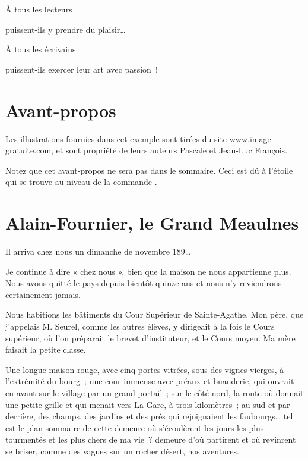 \documentclass[petitlivre]{livrelitt}
\begin{document}
\begin{dedicace}
À tous les lecteurs

puissent-ils y prendre du plaisir…

À tous les écrivains

puissent-ils exercer leur art avec passion !
\end{dedicace}

\chapter*{Avant-propos}

Les illustrations fournies dans cet exemple sont tirées du site www.image-gratuite.com, et sont propriété de leurs auteurs Pascale et Jean-Luc François.

Notez que cet avant-propos ne sera pas dans le sommaire. Ceci est dû à l'étoile qui se trouve au niveau de la commande .

\chapter{Alain-Fournier, le Grand Meaulnes}

Il arriva chez nous un dimanche de novembre 189…

Je continue à dire « chez nous », bien que la maison ne nous appartienne plus. Nous avons quitté le pays depuis bientôt quinze ans et nous n'y reviendrons certainement jamais.

Nous habitions les bâtiments du Cour Supérieur de Sainte-Agathe. Mon père, que j'appelais M. Seurel, comme les autres élèves, y dirigeait à la fois le Cours supérieur, où l'on préparait le brevet d'instituteur, et le Cours moyen. Ma mère faisait la petite classe.

Une longue maison rouge, avec cinq portes vitrées, sous des vignes vierges, à l'extrémité du bourg ; une cour immense avec préaux et buanderie, qui ouvrait en avant sur le village par un grand portail ; sur le côté nord, la route où donnait une petite grille et qui menait vers La Gare, à trois kilomètres ; au sud et par derrière, des champs, des jardins et des prés qui rejoignaient les faubourgs… tel est le plan sommaire de cette demeure où s'écoulèrent les jours les plus tourmentés et les plus chers de ma vie ? demeure d'où partirent et où revinrent se briser, comme des vagues sur un rocher désert, nos aventures.
\end{document}
